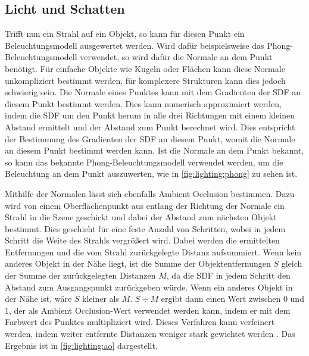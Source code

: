 \subsection{Licht und Schatten}
Trifft nun ein Strahl auf ein Objekt, so kann für diesen Punkt ein Beleuchtungsmodell ausgewertet werden.
Wird dafür beispielsweise das Phong-Beleuchtungsmodell verwendet, so wird dafür die Normale an dem Punkt benötigt.
Für einfache Objekte wie Kugeln oder Flächen kann diese Normale unkompliziert bestimmt werden, für komplexere Strukturen kann dies jedoch schwierig sein.
Die Normale eines Punktes kann mit dem Gradienten der SDF an diesem Punkt bestimmt werden.
Dies kann numerisch approximiert werden, indem die SDF um den Punkt herum in alle drei Richtungen mit einem kleinen Abstand ermittelt und der Abstand zum Punkt berechnet wird.
Dies entspricht der Bestimmung des Gradienten der SDF an diesem Punkt, womit die Normale an diesem Punkt bestimmt werden kann.
Ist die Normale an dem Punkt bekannt, so kann das bekannte Phong-Beleuchtungsmodell verwendet werden, um die Beleuchtung an dem Punkt auszuwerten, wie in \autoref{fig:lighting:phong} zu sehen ist.

Mithilfe der Normalen lässt sich ebenfalls Ambient Occlusion bestimmen.
Dazu wird von einem Oberflächenpunkt aus entlang der Richtung der Normale ein Strahl in die Szene geschickt und dabei der Abstand zum nächsten Objekt bestimmt.
Dies geschieht für eine feste Anzahl von Schritten, wobei in jedem Schritt die Weite des Strahls vergrößert wird.
Dabei werden die ermittelten Entfernungen und die vom Strahl zurückgelegte Distanz aufsummiert.
Wenn kein anderes Objekt in der Nähe liegt, ist die Summe der Objektentfernungen $S$ gleich der Summe der zurückgelegten Distanzen $M$, da die SDF in jedem Schritt den Abstand zum Ausgangspunkt zurückgeben würde.
Wenn ein anderes Objekt in der Nähe ist, wäre $S$ kleiner als $M$.
$S \div M$ ergibt dann einen Wert zwischen 0 und 1, der als Ambient Occlusion-Wert verwendet werden kann, indem er mit dem Farbwert des Punktes multipliziert wird.
Dieses Verfahren kann verfeinert werden, indem weiter entfernte Distanzen weniger stark gewichtet werden \cite{zucconi_ao}.
Das Ergebnis ist in \autoref{fig:lighting:ao} dargestellt.

